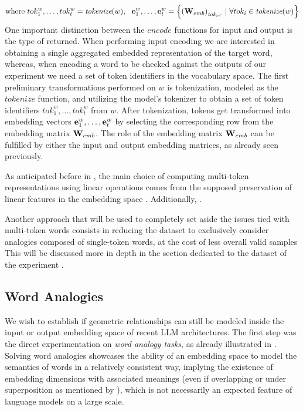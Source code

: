 \vspace{0.25em}
\begin{equation*}
    \text{where}\  tok_1^w,\ldots,tok_t^w = \textit{tokenize}(w)
    ,\ \ \bm{\mathbf{e}}_1^w, \ldots, \bm{\mathbf{e}}_{t}^w = \Bigl\{ {{(\bm{\mathbf{W}}_{emb})}_{\textit{tok}_{i},\cdot}} \ |\ \forall tok_i \in \textit{tokenize}(w) \Bigr\}
\end{equation*}
One important distinction between the $\textit{encode}$ functions for input and output is the type of  returned.
When performing input encoding we are interested in obtaining a single aggregated embedded representation of the target word, whereas, when encoding a word to be checked against the outputs of our experiment we need a set of token identifiers in the vocabulary space.
The first preliminary transformations performed on $w$ is tokenization, modeled as the $\textit{tokenize}$ function, and utilizing the model's tokenizer to obtain a set of token identifiers $tok_1^w,\ldots,tok_t^w$ from $w$.
After tokenization, tokens get transformed into embedding vectors $\bm{\mathbf{e}}_1^w, \ldots, \bm{\mathbf{e}}_{t}^w$ by selecting the corresponding row from the embedding matrix $\bm{\mathbf{W}}_{emb}$.
The role of the embedding matrix $\bm{\mathbf{W}}_{emb}$ can be fulfilled by either the input and output embedding matrices, as already seen previously.

As anticipated before in , the main choice of computing multi-token representations using linear operations comes from the supposed preservation of linear features in the embedding space .
Additionally, .

Another approach that will be used to completely set aside the issues tied with multi-token words consists in reducing the dataset to exclusively consider analogies composed of single-token words, at the cost of less overall valid samples
This will be discussed more in depth in the section dedicated to the dataset of the experiment .

\subsection{Word Analogies}\label{ssec:method_embeddings_analogies}

We wish to establish if geometric relationships can still be modeled inside the input or output embedding space of recent LLM architectures.
The first step  was the direct experimentation on \emph{word analogy tasks}, as already illustrated in \citet{mikolov2013}.
Solving word analogies showcases the ability of an embedding space to model the semantics of words in a relatively consistent way, implying the existence of embedding dimensions with associated meanings (even if overlapping or under superposition as mentioned by ), which is not necessarily an expected feature of language models on a large scale.

